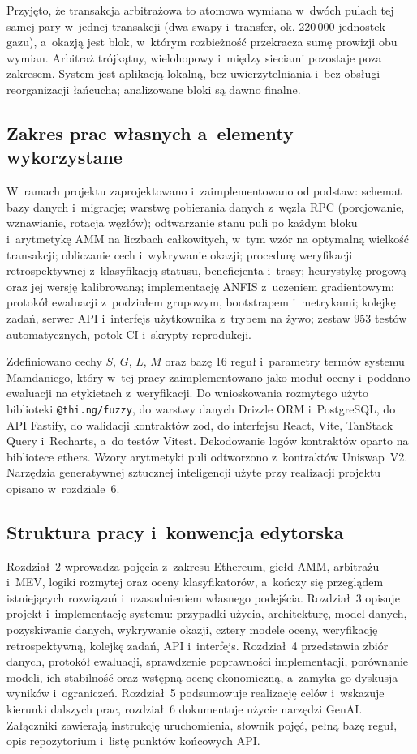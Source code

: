 Przyjęto, że transakcja arbitrażowa to atomowa wymiana w~dwóch pulach tej samej pary w~jednej
transakcji (dwa swapy i~transfer, ok. 220\,000 jednostek gazu), a~okazją jest blok, w~którym
rozbieżność przekracza sumę prowizji obu wymian. Arbitraż trójkątny, wielohopowy i~między
sieciami pozostaje poza zakresem. System jest aplikacją lokalną, bez uwierzytelniania
i~bez obsługi reorganizacji łańcucha; analizowane bloki są dawno finalne.

\subsection{Zakres prac własnych a~elementy wykorzystane}

W~ramach projektu zaprojektowano i~zaimplementowano od podstaw: schemat bazy danych
i~migracje; warstwę pobierania danych z~węzła RPC (porcjowanie, wznawianie, rotacja węzłów);
odtwarzanie stanu puli po każdym bloku i~arytmetykę AMM na liczbach całkowitych, w~tym wzór
na optymalną wielkość transakcji; obliczanie cech i~wykrywanie okazji; procedurę weryfikacji
retrospektywnej z~klasyfikacją statusu, beneficjenta i~trasy; heurystykę progową oraz jej
wersję kalibrowaną; implementację ANFIS z~uczeniem gradientowym; protokół ewaluacji
z~podziałem grupowym, bootstrapem i~metrykami; kolejkę zadań, serwer API i~interfejs
użytkownika z~trybem na żywo; zestaw 953 testów automatycznych, potok CI i~skrypty
reprodukcji.

Zdefiniowano cechy $S$, $G$, $L$, $M$
oraz bazę 16 reguł i~parametry termów systemu Mamdaniego, który w~tej pracy zaimplementowano jako moduł oceny i~poddano ewaluacji na etykietach z~weryfikacji. Do wnioskowania
rozmytego użyto biblioteki \texttt{@thi.ng/fuzzy}, do warstwy danych Drizzle ORM i~PostgreSQL,
do API Fastify, do walidacji kontraktów zod, do interfejsu React, Vite, TanStack Query
i~Recharts, a~do testów Vitest. Dekodowanie logów kontraktów oparto na bibliotece ethers.
Wzory arytmetyki puli odtworzono z~kontraktów Uniswap~V2. Narzędzia generatywnej sztucznej inteligencji użyte przy
realizacji projektu opisano w~rozdziale~6.

\subsection{Struktura pracy i~konwencja edytorska}

Rozdział~2 wprowadza pojęcia z~zakresu Ethereum, giełd AMM, arbitrażu i~MEV, logiki rozmytej
oraz oceny klasyfikatorów, a~kończy się przeglądem istniejących rozwiązań i~uzasadnieniem
własnego podejścia. Rozdział~3 opisuje projekt i~implementację systemu: przypadki użycia,
architekturę, model danych, pozyskiwanie danych, wykrywanie okazji, cztery modele oceny,
weryfikację retrospektywną, kolejkę zadań, API i~interfejs. Rozdział~4 przedstawia zbiór
danych, protokół ewaluacji, sprawdzenie poprawności implementacji, porównanie modeli, ich
stabilność oraz wstępną ocenę ekonomiczną, a~zamyka go dyskusja wyników i~ograniczeń.
Rozdział~5 podsumowuje realizację celów i~wskazuje kierunki dalszych prac, rozdział~6
dokumentuje użycie narzędzi GenAI. Załączniki zawierają instrukcję uruchomienia, słownik
pojęć, pełną bazę reguł, opis repozytorium i~listę punktów końcowych API.

